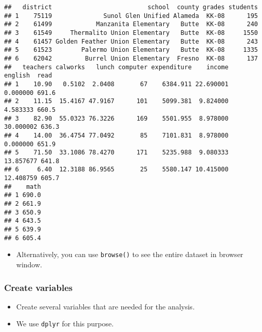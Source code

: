 \documentclass[]{book}
\newenvironment{Shaded}{\begin{snugshade}}{\end{snugshade}}
\newcommand{\DataTypeTok}[1]{\textcolor[rgb]{0.13,0.29,0.53}{#1}}
\newcommand{\DecValTok}[1]{\textcolor[rgb]{0.00,0.00,0.81}{#1}}
\newcommand{\KeywordTok}[1]{\textcolor[rgb]{0.13,0.29,0.53}{\textbf{#1}}}
\newcommand{\NormalTok}[1]{#1}
\newcommand{\OperatorTok}[1]{\textcolor[rgb]{0.81,0.36,0.00}{\textbf{#1}}}
\newcommand{\StringTok}[1]{\textcolor[rgb]{0.31,0.60,0.02}{#1}}
\providecommand{\tightlist}{%
  \setlength{\itemsep}{0pt}\setlength{\parskip}{0pt}}
\begin{document}
\begin{verbatim}
##   district                          school  county grades students
## 1    75119              Sunol Glen Unified Alameda  KK-08      195
## 2    61499            Manzanita Elementary   Butte  KK-08      240
## 3    61549     Thermalito Union Elementary   Butte  KK-08     1550
## 4    61457 Golden Feather Union Elementary   Butte  KK-08      243
## 5    61523        Palermo Union Elementary   Butte  KK-08     1335
## 6    62042         Burrel Union Elementary  Fresno  KK-08      137
##   teachers calworks   lunch computer expenditure    income   english  read
## 1    10.90   0.5102  2.0408       67    6384.911 22.690001  0.000000 691.6
## 2    11.15  15.4167 47.9167      101    5099.381  9.824000  4.583333 660.5
## 3    82.90  55.0323 76.3226      169    5501.955  8.978000 30.000002 636.3
## 4    14.00  36.4754 77.0492       85    7101.831  8.978000  0.000000 651.9
## 5    71.50  33.1086 78.4270      171    5235.988  9.080333 13.857677 641.8
## 6     6.40  12.3188 86.9565       25    5580.147 10.415000 12.408759 605.7
##    math
## 1 690.0
## 2 661.9
## 3 650.9
## 4 643.5
## 5 639.9
## 6 605.4
\end{verbatim}

\begin{itemize}
\tightlist
\item
  Alternatively, you can use \texttt{browse()} to see the entire dataset in browser window.
\end{itemize}

\hypertarget{create-variables}{%
\subsubsection{Create variables}\label{create-variables}}

\begin{itemize}
\tightlist
\item
  Create several variables that are needed for the analysis.
\item
  We use \texttt{dplyr} for this purpose.
\end{itemize}

\begin{Shaded}
\end{Shaded}
\end{document}
